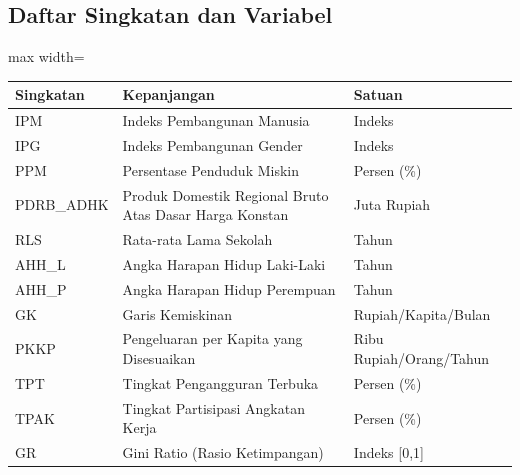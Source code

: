 \documentclass[11pt,a4paper]{article}
\begin{document}
\subsection*{Daftar Singkatan dan Variabel}
\begin{adjustbox}{max width=\textwidth}
\begin{tabular}{lll}
\toprule
\textbf{Singkatan} & \textbf{Kepanjangan} & \textbf{Satuan} \\
\midrule
IPM   & Indeks Pembangunan Manusia & Indeks \\
IPG   & Indeks Pembangunan Gender  & Indeks \\
PPM   & Persentase Penduduk Miskin & Persen (\%) \\
PDRB\_ADHK & Produk Domestik Regional Bruto Atas Dasar Harga Konstan & Juta Rupiah \\
RLS   & Rata-rata Lama Sekolah    & Tahun \\
AHH\_L & Angka Harapan Hidup Laki-Laki & Tahun \\
AHH\_P & Angka Harapan Hidup Perempuan & Tahun \\
GK    & Garis Kemiskinan          & Rupiah/Kapita/Bulan \\
PKKP  & Pengeluaran per Kapita yang Disesuaikan & Ribu Rupiah/Orang/Tahun \\
TPT   & Tingkat Pengangguran Terbuka & Persen (\%) \\
TPAK  & Tingkat Partisipasi Angkatan Kerja & Persen (\%) \\
GR    & Gini Ratio (Rasio Ketimpangan) & Indeks [0,1] \\
\bottomrule
\end{tabular}
\end{adjustbox}
\end{document}
